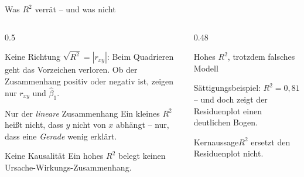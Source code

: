 \documentclass[aspectratio=169,11pt]{beamer}
\newcommand{\kernaussage}[1]{\begin{alertblock}{Kernaussage}#1\end{alertblock}}
\newcommand{\mindestzeilenabstand}{%
  \setlength{\lineskiplimit}{2pt}\setlength{\lineskip}{2pt}%
  \setlength{\normallineskiplimit}{2pt}\setlength{\normallineskip}{2pt}}
\newcommand{\saettpunkte}{\addplot[only marks, mark=*, mark size=2.2pt, color=hsbiblue]
  coordinates {(1,25) (2,32) (3,37) (4,41) (5,44) (6,46) (7,47) (8,48) (9,48) (10,47)};}
\begin{document}
\begin{frame}{Was $R^{2}$ verrät -- und was nicht}
  \begin{columns}[T]
    \begin{column}{0.5\textwidth}
      \small\mindestzeilenabstand
      \begin{block}{Keine Richtung}
        $\sqrt{R^{2}} = |r_{xy}|$: Beim Quadrieren geht das Vorzeichen verloren.
        Ob der Zusammenhang positiv oder negativ ist, zeigen nur $r_{xy}$ und
        $\hat{\beta}_1$.
      \end{block}
      \begin{block}{Nur der \emph{lineare} Zusammenhang}
        Ein kleines $R^{2}$ heißt nicht, dass $y$ nicht von $x$ abhängt -- nur,
        dass eine \emph{Gerade} wenig erklärt.
      \end{block}
      \begin{block}{Keine Kausalität}
        Ein hohes $R^{2}$ belegt keinen Ursache-Wirkungs-Zusammenhang.
      \end{block}
    \end{column}
    \begin{column}{0.48\textwidth}
      \small
      \begin{alertblock}{Hohes $R^{2}$, trotzdem falsches Modell}
        \begin{center}
        \end{center}
        Sättigungsbeispiel: $R^{2} = 0{,}81$ -- und doch zeigt der Residuenplot
        einen deutlichen Bogen.
      \end{alertblock}
      \kernaussage{$R^{2}$ ersetzt den Residuenplot nicht.}
    \end{column}
  \end{columns}
\end{frame}
\end{document}
